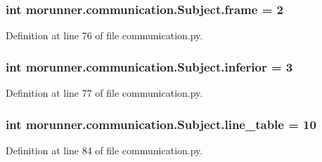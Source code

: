 \subsubsection[{frame}]{\setlength{\rightskip}{0pt plus 5cm}int morunner.\+communication.\+Subject.\+frame = 2\hspace{0.3cm}{\ttfamily [static]}}\label{classmorunner_1_1communication_1_1Subject_a096a79c71387142b11d5d536bda224ef}


Definition at line 76 of file communication.\+py.

\hypertarget{classmorunner_1_1communication_1_1Subject_a50b156272f64da73b4b8799847578da8}{}
\subsubsection[{inferior}]{\setlength{\rightskip}{0pt plus 5cm}int morunner.\+communication.\+Subject.\+inferior = 3\hspace{0.3cm}{\ttfamily [static]}}\label{classmorunner_1_1communication_1_1Subject_a50b156272f64da73b4b8799847578da8}


Definition at line 77 of file communication.\+py.

\hypertarget{classmorunner_1_1communication_1_1Subject_aea4d95ee9a997eeb2368bf8665837517}{}
\subsubsection[{line\+\_\+table}]{\setlength{\rightskip}{0pt plus 5cm}int morunner.\+communication.\+Subject.\+line\+\_\+table = 10\hspace{0.3cm}{\ttfamily [static]}}\label{classmorunner_1_1communication_1_1Subject_aea4d95ee9a997eeb2368bf8665837517}


Definition at line 84 of file communication.\+py.

\hypertarget{classmorunner_1_1communication_1_1Subject_a632bc45f41b3da11876076c3ec353e21}{}
